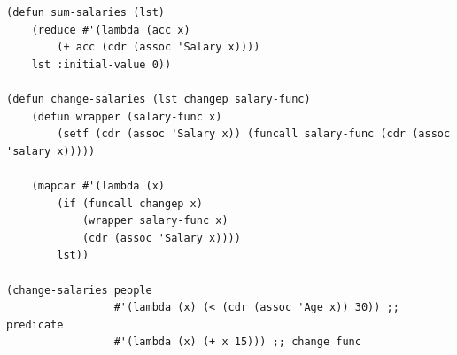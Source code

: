 \documentclass[12pt]{report}
\begin{document}
\begin{lstlisting}
(defun sum-salaries (lst)
	(reduce #'(lambda (acc x)
		(+ acc (cdr (assoc 'Salary x))))
	lst :initial-value 0))

(defun change-salaries (lst changep salary-func)
	(defun wrapper (salary-func x)
		(setf (cdr (assoc 'Salary x)) (funcall salary-func (cdr (assoc 'salary x)))))

	(mapcar #'(lambda (x)
		(if (funcall changep x)
			(wrapper salary-func x)
			(cdr (assoc 'Salary x))))
		lst))

(change-salaries people
				 #'(lambda (x) (< (cdr (assoc 'Age x)) 30)) ;; predicate
				 #'(lambda (x) (+ x 15))) ;; change func
\end{lstlisting}

	
	
	
\end{document}
